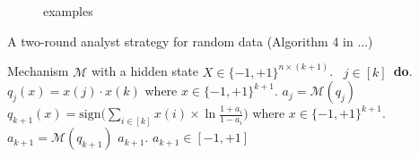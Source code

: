 \documentclass{article}
\begin{document}
\begin{figure}
\caption{examples}
\end{figure}



\begin{algorithm}
\caption{A two-round analyst strategy for random data (Algorithm 4 in ...)}
\label{alg:BitGOF}
\begin{algorithmic}
\REQUIRE Mechanism $\mathcal{M}$ with a hidden state $X\in \{-1,+1\}^{n\times (k+1)}$.
\ $j\in [k]$\ {\bf do}.  
\STATE {} $q_j(x)=x(j)\cdot x(k)$ where $x\in \{-1,+1\}^{k+1}$.
\STATE {} $a_j=\mathcal{M}(q_j)$ 
\STATE \qquad {}
 $q_{k+1}(x)=\mathrm{sign}\big (\sum_{i\in [k]} x(i)\times\ln\frac{1+a_i}{1-a_i} \big )$ where $x\in \{-1,+1\}^{k+1}$.
\STATE{}
 $a_{k+1}=\mathcal{M}(q_{k+1})$
\STATE{}
\RETURN $a_{k+1}$.
\ENSURE $a_{k+1}\in [-1,+1]$
\end{algorithmic}
\end{algorithm}
\end{document}
